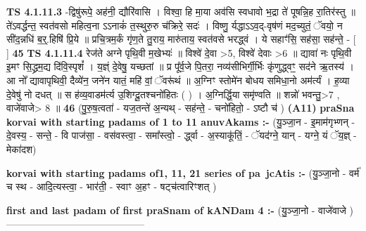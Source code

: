 \documentclass[17pt]{extarticle}
\begin{document}
                  \newline
                                \textbf{ TS 4.1.11.3} \newline
                  -द्विषु॑रूपे॒ अह॑नी॒ द्यौरि॑वासि । विश्वा॒ हि मा॒या अव॑सि स्वधावो भ॒द्रा ते॑ पूषन्नि॒ह रा॒तिर॑स्तु ॥ ते॑ऽवर्द्धन्त॒ स्वत॑वसो महित्व॒ना ऽऽनाकं॑ त॒स्थुरु॒रु च॑क्रिरे॒ सदः॑ । विष्णु॒ र्यद्धाऽऽव॒द्-वृष॑णं मद॒च्युतं॒ ॅवयो॒ न सी॑द॒न्नधि॑ ब॒र्॒.हिषि॑ प्रि॒ये ॥ प्रचि॒त्रम॒र्कं गृ॑ण॒ते तु॒राय॒ मारु॑ताय॒ स्वत॑वसे भरद्ध्वं । ये सहाꣳ॑सि॒ सह॑सा॒ सह॑न्ते॒ - [  ] \textbf{  45} \newline
                  \newline
                                \textbf{ TS 4.1.11.4} \newline
                  रेज॑ते अग्ने पृथि॒वी म॒खेभ्यः॑ ॥ विश्वे॑ दे॒वा >5, विश्वे॑ देवाः >6 ॥ द्यावा॑ नः पृथि॒वी इ॒मꣳ सि॒द्ध्रम॒द्य दि॑वि॒स्पृशं᳚ । य॒ज्ञ्ं दे॒वेषु॒ यच्छतां ॥ प्र पू᳚र्व॒जे पि॒तरा॒ नव्य॑सीभिर्गी॒र्भिः कृ॑णुद्ध्वꣳ॒॒ सद॑ने ऋ॒तस्य॑ । आ नो᳚ द्यावापृथिवी॒ दैव्ये॑न॒ जने॑न यातं॒ महि॑ वां॒ ॅवरू॑थं ॥ अ॒ग्निꣳ स्तोमे॑न बोधय समिधा॒नो अम॑र्त्यं । ह॒व्या दे॒वेषु॑ नो दधत् ॥ स ह॑व्य॒वाडम॑र्त्य उ॒शिग्दू॒तश्चनो॑हितः ( ) । अ॒ग्निर्द्धि॒या समृ॑ण्वति ॥ शन्नो॑ भवन्तु॒>7 , वाजे॑वाजे> 8 ॥ \textbf{  46} \newline
                  \newline
                      (पु॒रु॒ष॒त्वता॑ - यज॒तन्ते॑ अ॒न्यथ् - सह॑न्ते॒ - चनो॑हितो॒ - ऽष्टौ च॑ )  \textbf{(A11)} \newline \newline
                \textbf{praSna korvai with starting padams of 1 to 11 anuvAkams :-} \newline
        (यु॒ञ्जा॒न - इ॒माम॑गृभ्णन् - दे॒वस्य॒ - सन्ते॒ - वि पाज॑सा॒ - वस॑वस्त्वा॒ - समा᳚स्त्वो॒ - र्द्ध्वा - अ॒स्याकू॑तिं॒ - ॅयद॑ग्ने॒ यान् - यग्ने॒ यं ॅय॒ज्ञ् - मेका॑दश) \newline

        \textbf{korvai with starting padams of1, 11, 21 series of pa~jcAtis :-} \newline
        (यु॒ञ्जा॒नो - वर्म॑ च स्थ - आदि॒त्यस्त्वा॒ - भार॑ती॒ - स्वाꣳ अ॒हꣳ - षट्च॑त्वारिꣳशत् ) \newline

        \textbf{first and last padam of first praSnam of kANDam 4 :-} \newline
        (यु॒ञ्जा॒नो - वाजे॑वाजे )
------------------------------------------ \newline 
\end{document}

